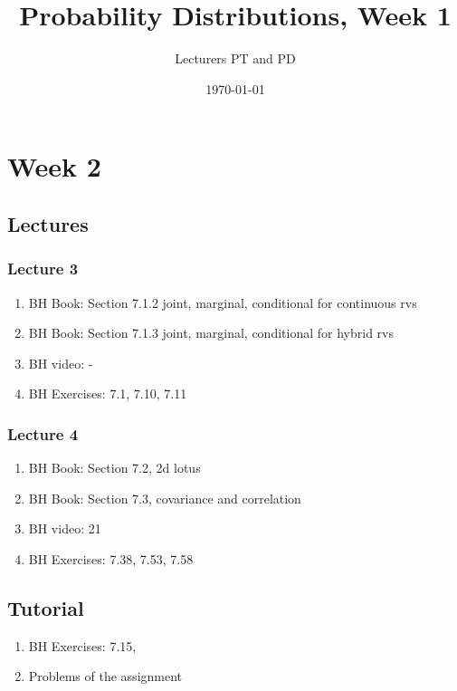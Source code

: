\documentclass[a4paper,12pt]{book}
\author{Lecturers PT and PD
}
\date{\today}
\title{Probability Distributions, Week 1}
\begin{document}
\maketitle
\tableofcontents

\chapter{Week 2}
\label{cha:week-1}



\section{Lectures}
\label{sec:lectures}

\subsection{Lecture 3}
\label{sec:lecture-1}

\begin{enumerate}
\item BH Book: Section 7.1.2 joint, marginal, conditional for continuous rvs
\item BH Book: Section 7.1.3 joint, marginal, conditional for hybrid rvs
\item BH video: -
\item BH Exercises: 7.1, 7.10, 7.11
\end{enumerate}


\subsection{Lecture 4}
\label{sec:lecture-1}
\begin{enumerate}
\item BH Book: Section 7.2, 2d lotus
\item BH Book:  Section 7.3, covariance and correlation
\item BH video: 21
\item BH Exercises: 7.38, 7.53, 7.58
\end{enumerate}


\section{Tutorial}
\label{sec:tutorial}

\begin{enumerate}
\item BH Exercises: 7.15,
\item Problems of the  assignment
\end{enumerate}
\end{document}
